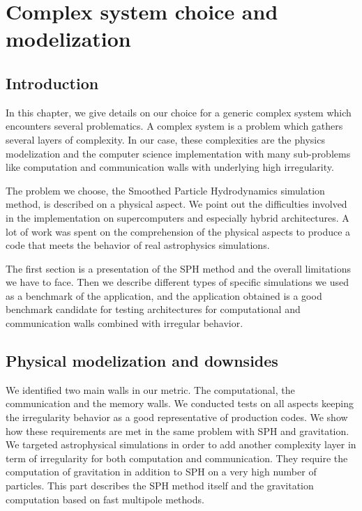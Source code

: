 \chapter{Complex system choice and modelization}

\section{Introduction}
In this chapter, we give details on our choice for a generic complex system which encounters several problematics. 
A complex system is a problem which gathers several layers of complexity. 
In our case, these complexities are the physics modelization and the computer science implementation with many sub-problems like computation and communication walls with underlying high irregularity. 
 
The problem we choose, the Smoothed Particle Hydrodynamics simulation method, is described on a physical aspect.
We point out the difficulties involved in the implementation on supercomputers and especially hybrid architectures.  
A lot of work was spent on the comprehension of the physical aspects to produce a code that meets the behavior of real astrophysics simulations.

The first section is a presentation of the SPH method and the overall limitations we have to face. 
Then we describe different types of specific simulations we used as a benchmark of the application, and the application obtained is a good benchmark candidate for testing architectures for computational and communication walls combined with irregular behavior.

\section{Physical modelization and downsides}
We identified two main walls in our metric.
The computational, the communication and the memory walls.
We conducted tests on all aspects keeping the irregularity behavior as a good representative of production codes.
We show how these requirements are met in the same problem with SPH and gravitation.
We targeted astrophysical simulations in order to add another complexity layer in term of irregularity for both computation and communication. 
They require the computation of gravitation in addition to SPH on a very high number of particles. 
This part describes the SPH method itself and the gravitation computation based on fast multipole methods. 

